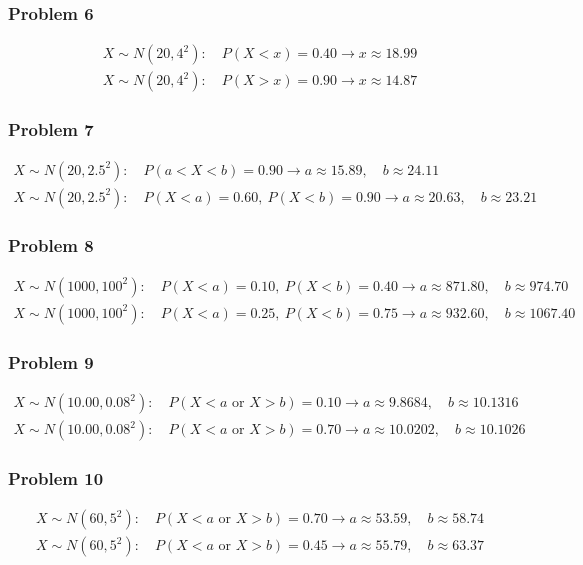 \subsubsection{Problem 6}
\[
\begin{array}{l}
	X\sim N(20,4^2):\quad P(X<x)=0.40 \longrightarrow x\approx 18.99\\
	X\sim N(20,4^2):\quad P(X>x)=0.90 \longrightarrow x\approx 14.87
\end{array}
\]

\subsubsection{Problem 7}
\[
\begin{array}{l}
	X\sim N(20,2.5^2):\quad P(a<X<b)=0.90 \longrightarrow a\approx 15.89,\quad b\approx 24.11\\
	X\sim N(20,2.5^2):\quad P(X<a)=0.60,\ P(X<b)=0.90 \longrightarrow a\approx 20.63,\quad b\approx 23.21
\end{array}
\]

\subsubsection{Problem 8}
\[
\begin{array}{l}
	X\sim N(1000,100^2):\quad P(X<a)=0.10,\ P(X<b)=0.40 \longrightarrow a\approx 871.80,\quad b\approx 974.70\\
	X\sim N(1000,100^2):\quad P(X<a)=0.25,\ P(X<b)=0.75 \longrightarrow a\approx 932.60,\quad b\approx 1067.40
\end{array}
\]

\subsubsection{Problem 9}
\[
\begin{array}{l}
	X\sim N(10.00,0.08^2):\quad P(X<a\text{ or }X>b)=0.10 \longrightarrow a\approx 9.8684,\quad b\approx 10.1316\\
	X\sim N(10.00,0.08^2):\quad P(X<a\text{ or }X>b)=0.70 \longrightarrow a\approx 10.0202,\quad b\approx 10.1026
\end{array}
\]

\subsubsection{Problem 10}
\[
\begin{array}{l}
	X\sim N(60,5^2):\quad P(X<a\text{ or }X>b)=0.70 \longrightarrow a\approx 53.59,\quad b\approx 58.74\\
	X\sim N(60,5^2):\quad P(X<a\text{ or }X>b)=0.45 \longrightarrow a\approx 55.79,\quad b\approx 63.37
\end{array}
\]


